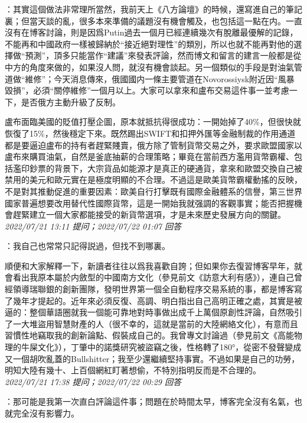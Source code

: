 \documentclass[twocolumn]{ctexart}
\begin{document}
：其實這個做法非常理所當然，我前天上《八方論壇》的時候，還寫進自己的筆記裏；但當天談的亂，很多本來準備的議題沒有機會觸及，也包括這一點在内。一直沒有在博客討論，則是因爲Putin過去一個月已經連續幾次有脫離最優解的記錄，不能再和中國政府一樣被歸納於“接近絕對理性”的類別，所以也就不能再對他的選擇做“預測”，頂多只能當作“建議”來發表評論，然而博文和留言的建言一般都是從中方的角度來做的，如果沒人問，就沒有機會談起。另一個類似的手段是對油氣管道做“維修”；今天消息傳來，俄國國内一條主要管道在Novorossiysk附近因“風暴毀損”，必須“關停維修”一個月以上。大家可以拿來和盧布交易這件事一並考慮一下，是否俄方主動升級了反制。

盧布面臨美國的貶值打壓企圖，原本就抵抗得很成功：一開始掉了40\%，但很快就恢復了15\%，然後穩定下來。既然踢出SWIFT和扣押外匯等金融制裁的作用通道都是要逼迫盧布的持有者趕緊賤賣，俄方除了管制貨幣交易之外，要求歐盟國家以盧布來購買油氣，自然是釜底抽薪的合理策略；畢竟在當前西方濫用貨幣霸權、包括濫印鈔票的背景下，大宗貨品如能源才是真正的硬通貨，拿來和歐盟交換自己被禁用的美元和歐元實在是極度明顯的不合理。不過這是歐美貨幣霸權動搖的反映，不是對其推動促進的重要因素：歐美自行打擊既有國際金融體系的信譽，第三世界國家普遍想要改用替代性國際貨幣，這是一開始我就强調的客觀事實；能否把握機會趕緊建立一個大家都能接受的新貨幣選項，才是未來歷史發展方向的關鍵。
\\

\textit{\hfill\noindent\small 2022/07/21 13:11 提问；2022/07/22 01:07 回答}

：我自己也常常只記得説過，但找不到哪裏。

順便和大家解釋一下，新讀者往往以爲我喜歡自誇；但如果你去復習博客早年，就會看出我原本屬於内斂型的中國南方文化（參見前文《訪意大利有感》），連自己曾經領導瑞聯銀的創新團隊，發明世界第一個全自動程序交易系統的事，都是博客寫了幾年才提起的。近年來必須反復、高調、明白指出自己高明正確之處，其實是被逼的：整個華語圈就我一個能可靠地對時事做出成千上萬個原創性評論，自然吸引了一大堆盜用智慧財產的人（很不幸的，這就是當前的大陸網絡文化），有意而且習慣性地竊取我的創新論點、假裝成自己的。我曾專文討論過（參見前文《高能物理的牛屎文化》），丁肇中的諾獎研究被盜竊之後，性格轉了180°，從密不發聲變成又一個胡吹亂蓋的Bullshitter；我至少還繼續堅持事實。不過如果是自己的功勞，明知大陸有幾十、上百個網紅盯著想偷，不特別指明反而是不合理的。
\\

\textit{\hfill\noindent\small 2022/07/21 17:38 提问；2022/07/22 00:29 回答}

：那可能是我第一次直白評論這件事；問題在於時間太早，博客完全沒有名氣，也就完全沒有影響力。
\\
\end{document}
